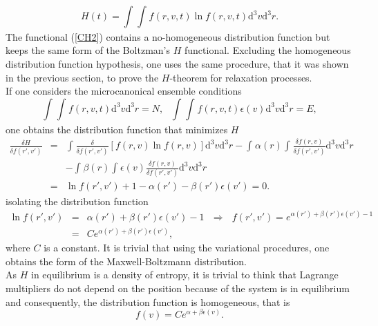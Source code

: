\documentclass{article}
\begin{document}
\begin{equation}
   H(t)=\int_{}^{}\int_{}^{} f(r,v,t) \ln f(r,v,t)\mathrm{d}^3v \mathrm{d}^3r \label{CH2}.
\end{equation}{}
The functional (\ref{CH2}) contains a no-homogeneous distribution function but keeps the same form of the Boltzman's $H$ functional. Excluding the homogeneous distribution function hypothesis, one uses the same procedure, that it was shown in the previous section, to prove the $H$-theorem for relaxation processes.\\ 
If one considers the microcanonical ensemble conditions 
\begin{equation}
    \int_{}^{}\int_{}^{}f(r,v,t)\mathrm{d}^3v \mathrm{d}^3r=N, \ \ \ \int_{}^{}\int_{}^{}f(r,v,t)\epsilon(v)\mathrm{d}^3v \mathrm{d}^3r=E \label{micro},
\end{equation}{}
one obtains the distribution function that minimizes $H$
\begin{eqnarray}
\frac{\delta H}{\delta f(r',v')}&=&\int_{}^{}\frac{\delta}{\delta f(r',v')}\left[f(r,v)\ln f(r,v)  \right]\mathrm{d}^3v \mathrm{d}^3r-\int_{}^{}\alpha(r)\int_{}^{}\frac{\delta f(r,v)}{\delta f(r',v')}\mathrm{d}^3v \mathrm{d}^3r\nonumber \\
&&-\int_{}^{}\beta(r) \int_{}^{}\epsilon(v)\frac{\delta f(r,v)}{\delta f(r',v')}\mathrm{d}^3v \mathrm{d}^3r\nonumber \\
&=&\ln f(r',v')+1-\alpha(r')-\beta(r') \epsilon(v')=0.
\end{eqnarray}{}
isolating the distribution function 
\begin{eqnarray}
\ln f(r',v')&=&\alpha(r')+\beta(r') \epsilon(v')-1 \ \ \  \Rightarrow \ \ \ f(r',v')=e^{\alpha(r') +\beta(r') \epsilon(v')-1} \nonumber \\
&=&Ce^{\alpha(r')+\beta(r') \epsilon(v') } \label{relacion1},
\end{eqnarray}{}
where $C$ is a constant. It is trivial that using the variational procedures, one obtains the form of the Maxwell-Boltzmann distribution. \\
As $H$ in equilibrium is a density of entropy, it is trivial to think that Lagrange multipliers do not depend on the position because of the system is in equilibrium and consequently, the distribution function is homogeneous, that is
\begin{equation}
    f(v)=Ce^{\alpha+\beta \epsilon(v)}.
\end{equation}{}
\end{document}
